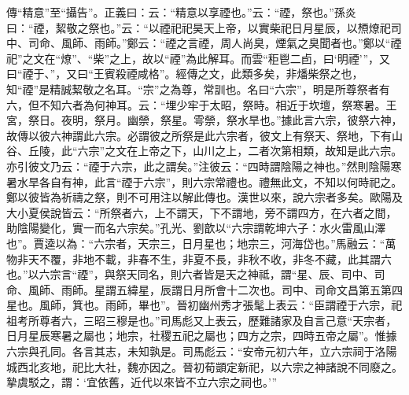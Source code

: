 {\noindent\zhuan{}\fzbyks 傳“精意”至“攝告”。正義曰：云：“精意以享禋也。”云：“禋，祭也。”孫炎曰：“禋，絜敬之祭也。”云：“以禋祀祀昊天上帝，以實柴祀日月星辰，以槱燎祀司中、司命、風師、雨師。”鄭云：“禋之言禋，周人尚臭，煙氣之臭聞者也。”鄭以“禋祀”之文在“燎”、“柴”之上，故以“禋”為此解耳。而雲“秬鬯二卣，曰‘明禋’”，又曰“禋于、”，又曰“王賓殺禋咸格”。經傳之文，此類多矣，非燔柴祭之也，知“禋”是精誠絜敬之名耳。“宗”之為尊，常訓也。名曰“六宗”，明是所尊祭者有六，但不知六者為何神耳。云：“埋少牢于太昭，祭時。相近于坎壇，祭寒暑。王宮，祭日。夜明，祭月。幽禜，祭星。雩禜，祭水旱也。”據此言六宗，彼祭六神，故傳以彼六神謂此六宗。必謂彼之所祭是此六宗者，彼文上有祭天、祭地，下有山谷、丘陵，此“六宗”之文在上帝之下，山川之上，二者次第相類，故知是此六宗。亦引彼文乃云：“禋于六宗，此之謂矣。”注彼云：“四時謂陰陽之神也。”然則陰陽寒暑水旱各自有神，此言“禋于六宗”，則六宗常禮也。禮無此文，不知以何時祀之。鄭以彼皆為祈禱之祭，則不可用注以解此傳也。漢世以來，說六宗者多矣。歐陽及大小夏侯說皆云：“所祭者六，上不謂天，下不謂地，旁不謂四方，在六者之間，助陰陽變化，實一而名六宗矣。”孔光、劉歆以“六宗謂乾坤六子：水火雷風山澤也”。賈逵以為：“六宗者，天宗三，日月星也；地宗三，河海岱也。”馬融云：“萬物非天不覆，非地不載，非春不生，非夏不長，非秋不收，非冬不藏，此其謂六也。”以六宗言“禋”，與祭天同名，則六者皆是天之神祗，謂“星、辰、司中、司命、風師、雨師。星謂五緯星，辰謂日月所會十二次也。司中、司命文昌第五第四星也。風師，箕也。雨師，畢也”。晉初幽州秀才張髦上表云：“臣謂禋于六宗，祀祖考所尊者六，三昭三穆是也。”司馬彪又上表云，歷難諸家及自言己意“天宗者，日月星辰寒暑之屬也；地宗，社稷五祀之屬也；四方之宗，四時五帝之屬”。惟據六宗與孔同。各言其志，未知孰是。司馬彪云：“安帝元初六年，立六宗祠于洛陽城西北亥地，祀比大社，魏亦因之。晉初荀顗定新祀，以六宗之神諸說不同廢之。摯虞駁之，謂：‘宜依舊，近代以來皆不立六宗之祠也。’” \par}

